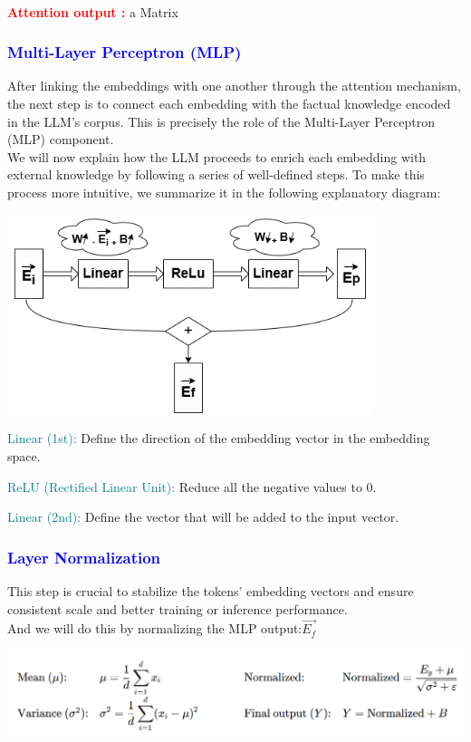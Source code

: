 \documentclass[12pt]{article}
\begin{document}
\textcolor{red}{\textbf{\\Attention output :}} a Matrix

\newpage

\textcolor{blue}{\subsubsection{Multi-Layer Perceptron (MLP)}}
After linking the embeddings with one another through the attention mechanism, the next step is to connect each embedding with the factual knowledge encoded in the LLM’s corpus. This is precisely the role of the Multi-Layer Perceptron (MLP) component.\\
We will now explain how the LLM proceeds to enrich each embedding with external knowledge by following a series of well-defined steps. To make this process more intuitive, we summarize it in the following explanatory diagram:\\
\vspace*{0.4cm}
\begin{center}
    \includegraphics[width=0.8\textwidth]{images/llm8.png}
\end{center}

\textcolor{teal}{Linear (1st):} Define the direction of the embedding vector in the embedding space.

\textcolor{teal}{ReLU (Rectified Linear Unit):} Reduce all the negative values to 0.

\textcolor{teal}{Linear (2nd):} Define the vector that will be added to the input vector.

\textcolor{blue}{\subsubsection{Layer Normalization}}
This step is crucial to stabilize the tokens’ embedding vectors and ensure consistent scale and better training or inference performance.\\And we will do this by normalizing the MLP output:\textbf{\(\overrightarrow{E_f}\)}\\
\begin{center}
    \includegraphics[width=\textwidth]{images/formula7.png}
\end{center}
\end{document}
